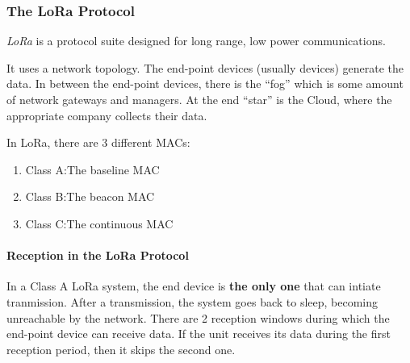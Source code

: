 \subsubsection{The LoRa Protocol}\label{subsubsec:LoRa_Protocol}
\begin{definition}[LoRa]\label{def:LoRa}
  \emph{LoRa} is a protocol suite designed for long range, low power communications.

  It uses a  network topology.
  The end-point devices (usually  devices) generate the data.
  In between the end-point devices, there is the ``fog'' which is some amount of network gateways and managers.
  At the end ``star'' is the Cloud, where the appropriate company collects their data.
\end{definition}

In LoRa, there are 3 different MACs:
\begin{enumerate}[noitemsep]
\item Class A:\@ The baseline MAC
\item Class B:\@ The beacon MAC
\item Class C:\@ The continuous MAC
\end{enumerate}

\paragraph{Reception in the LoRa Protocol}\label{par:LoRa_Reception}
In a Class A LoRa system, the end device is \textbf{the only one} that can intiate tranmission.
After a transmission, the system goes back to sleep, becoming unreachable by the network.
There are 2 reception windows during which the end-point device can receive data.
If the unit receives its data during the first reception period, then it skips the second one.

